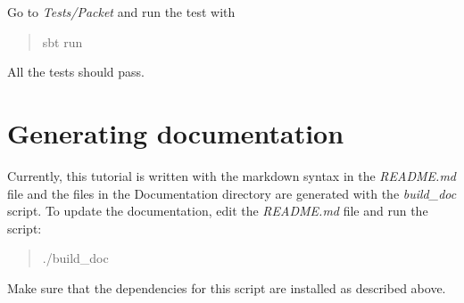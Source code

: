 Go to \emph{Tests/Packet} and run the test with

\begin{quote}
sbt run
\end{quote}

All the tests should pass.

\section{Generating documentation}\label{generating-documentation}

Currently, this tutorial is written with the markdown syntax in the
\emph{README.md} file and the files in the Documentation directory are
generated with the \emph{build\_doc} script. To update the
documentation, edit the \emph{README.md} file and run the script:

\begin{quote}
./build\_doc
\end{quote}

Make sure that the dependencies for this script are installed as
described above.
